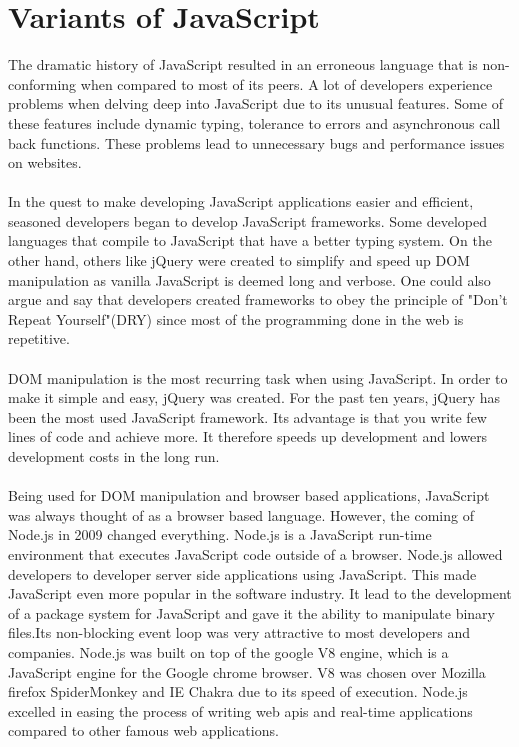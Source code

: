 \section{Variants of JavaScript}
The dramatic history of JavaScript resulted in an erroneous language that is non-conforming when compared to most of its peers. A lot of developers experience problems when delving deep into JavaScript due to its unusual features. Some of these features include dynamic typing, tolerance to errors and asynchronous call back functions. These problems lead to unnecessary bugs and performance issues on websites.
\paragraph{}
In the quest to make developing JavaScript applications easier and efficient, seasoned developers began to develop JavaScript frameworks. Some developed languages that compile to JavaScript that have a better typing system. On the other hand, others like jQuery were created to simplify and speed up DOM manipulation as vanilla JavaScript is deemed long and verbose. One could also argue and say that developers created frameworks to obey the principle of "Don't Repeat Yourself"(DRY) since most of the programming done in the web is repetitive. 
\paragraph{}
DOM manipulation is the most recurring task when using JavaScript. In order to make it simple and easy, jQuery was created. For the past ten years, jQuery has been the most used JavaScript framework. Its advantage is that you write few lines of code and achieve more. It therefore speeds up development and lowers development costs in the long run.
\paragraph{}
Being used for DOM manipulation and browser based applications, JavaScript was always thought of as a browser based language. However, the coming of Node.js in 2009 changed everything. Node.js is a JavaScript run-time environment that executes JavaScript code outside of a browser. Node.js allowed developers to developer server side applications using JavaScript. This made JavaScript even more popular in the software industry. It lead to the development of a package system for JavaScript and gave it the ability to manipulate binary files.Its non-blocking event loop was very attractive to most developers and companies. Node.js was built on top of the google V8 engine, which is a JavaScript engine for the Google chrome browser. V8 was chosen over Mozilla firefox SpiderMonkey and IE Chakra due to its speed of execution. Node.js excelled in easing the process of writing web apis and real-time applications compared to other famous web applications.
